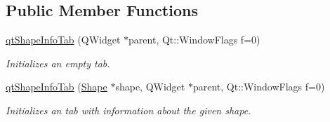 \subsection*{Public Member Functions}
\begin{DoxyCompactItemize}
\item 
\hypertarget{classqt_shape_info_tab_a1e24b3b05a98ebf3aec79cd7c0c3e8ba}{}\hyperlink{classqt_shape_info_tab_a1e24b3b05a98ebf3aec79cd7c0c3e8ba}{qt\+Shape\+Info\+Tab} (Q\+Widget $\ast$parent, Qt\+::\+Window\+Flags f=0)\label{classqt_shape_info_tab_a1e24b3b05a98ebf3aec79cd7c0c3e8ba}

\begin{DoxyCompactList}\small\item\em Initializes an empty tab. \end{DoxyCompactList}\item 
\hypertarget{classqt_shape_info_tab_ad110fe4c0e748e126ee030a078714b72}{}\hyperlink{classqt_shape_info_tab_ad110fe4c0e748e126ee030a078714b72}{qt\+Shape\+Info\+Tab} (\hyperlink{class_shape}{Shape} $\ast$shape, Q\+Widget $\ast$parent, Qt\+::\+Window\+Flags f=0)\label{classqt_shape_info_tab_ad110fe4c0e748e126ee030a078714b72}

\begin{DoxyCompactList}\small\item\em Initializes an tab with information about the given shape. \end{DoxyCompactList}\end{DoxyCompactItemize}
